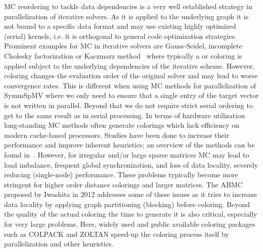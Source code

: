 
\Acrfull{MC} reordering to tackle data dependencies is a very well established strategy in parallelization of iterative solvers. As it is applied to the underlying graph it is not bound to a specific data format and may use existing highly optimized (serial) kernels, i.e. it is orthogonal to general code optimization strategies.  
Prominent examples for  \acrshort{MC} in iterative solvers are Gauss-Seidel, incomplete 
Cholesky factorization or Kaczmarz method~\cite{RBGS,MC,feast_mc} where typically a \DONE or \DTWO coloring is applied subject to the underlying dependencies of the iterative scheme. However, coloring changes the evaluation order of the original solver and may lead to worse convergence rates. This is different when using  \acrshort{MC} methods for parallelization of \acrshort{SymmSpMV} where we only need to ensure that a single entry of the target vector is not written in parallel. Beyond that we do not  require strict serial ordering to get to the same result as in serial processing.
In terms of hardware utilization long-standing \acrshort{MC} methods often generate colorings which lack efficiency on modern cache-based
processors. Studies have been done to increase their
performance and improve inherent heuristics; an overview of the methods can be found in~\cite{gebremedhin2000scalable,dist_k_def,COLPACK,equitable_color}. However, 
for irregular and/or large sparse 
matrices \acrshort{MC} may lead to load imbalance, frequent global synchronization, 
and loss of data locality, severely reducing (single-node) performance. 
These problems typically become more stringent for higher order distance
colorings and larger matrices.
The \acrfull{ABMC}~\cite{ABMC} proposed by Iwashita \etal in 2012 addresses some of these issues as it tries to increase data locality by applying graph partitioning (blocking) before coloring. 
Beyond the quality of the actual coloring the time to generate it is also critical, especially for very large problems. Here, widely used and public available coloring packages such as COLPACK\cite{COLPACK} and ZOLTAN\cite{BOZDAG2008515,doi:10.1137/080732158} speed-up the coloring process itself by parallelization and other heuristics.  

